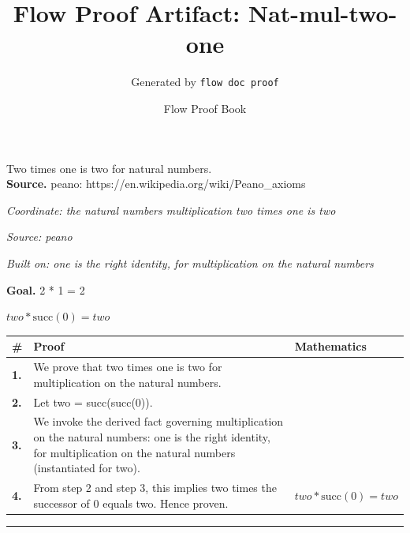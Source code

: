 \documentclass[11pt]{article}
\title{Flow Proof Artifact: Nat-mul-two-one}
\author{Generated by \texttt{flow doc proof}}
\date{Flow Proof Book}
\theoremstyle{definition}
\begin{document}
\maketitle
Two times one is two for natural numbers.\\[0.5em]
\textbf{Source.} peano: https://en.wikipedia.org/wiki/Peano\_axioms\\[0.5em]
\bigskip
{}\par
\smallskip\noindent\textit{Coordinate: the natural numbers \cdot multiplication \cdot two times one is two}\par
\smallskip\noindent\textit{Source: peano}\par
\smallskip\noindent\textit{Built on: one is the right identity, for multiplication on the natural numbers}\par
\medskip
\noindent\textbf{Goal.} 2 * 1 = 2\par
\noindent$\displaystyle two * \mathrm{succ}(0) = two$\par
\medskip
\noindent
\begin{tabular}{@{} >{\raggedright\arraybackslash}p{} >{\raggedright\arraybackslash}p{} >{\raggedleft\arraybackslash}p{} @{}}
\textbf{\#} & \textbf{Proof} & \textbf{Mathematics} \\
\midrule
\textbf{1.} & We prove that two times one is two for multiplication on the natural numbers. & \\[0.45em]
\textbf{2.} & Let two = succ(succ(0)). & \\[0.45em]
\textbf{3.} & We invoke the derived fact governing multiplication on the natural numbers: one is the right identity, for multiplication on the natural numbers (instantiated for two). & \\[0.45em]
\textbf{4.} & From step 2 and step 3, this implies two times the successor of 0 equals two. Hence proven. & $\displaystyle two * \mathrm{succ}(0) = two$ \\[0.45em]
\bottomrule
\end{tabular}
\label{thm:Nat-multiplication-two_times_one_is_two}
\par\medskip\hrule
\end{document}
